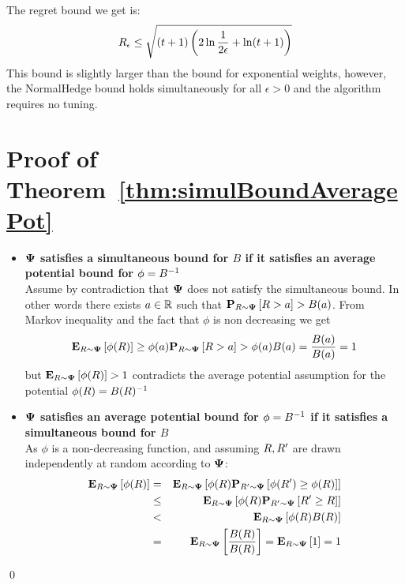 \documentclass{article}[12pt]
\begin{document}
The regret bound we get is:
\begin{equation}
  R_\epsilon \leq \sqrt{(t+1) \left(2 \ln \frac{1}{2\epsilon}+
      \ln (t+1)\right)}
\end{equation}
This bound is slightly larger than the bound for exponential weights,
however, the NormalHedge bound holds simultaneously for all
$\epsilon>0$ and the algorithm requires no tuning.




\appendix
\section{Proof of Theorem~\ref{thm:simulBoundAveragePot} \label{proof:simulBoundAveragePot}}
\proof
  \begin{itemize}
  \item
  {\bf ${\bf \Psi}$ satisfies a simultaneous bound for $B$ if it satisfies an
  average potential bound for $\phi = B^{-1}$}\\
Assume by contradiction that ${\bf \Psi}$ does not satisfy the simultaneous bound. In
other words there exists $a \in \mathbb{R}$ such that
${\bf P}_{R \sim {\bf \Psi}}\left[ R > a \right] > B(a)$. From Markov inequality and the fact
that $\phi$ is non decreasing we get
\[
  {\bf E}_{R \sim {\bf \Psi}}\left[ \phi(R) \right] \geq \phi(a) {\bf P}_{R \sim {\bf \Psi}}\left[ R > a \right] >
  \phi(a) B(a) = \frac{B(a)}{B(a)}=1
\]
but $ {\bf E}_{R \sim {\bf \Psi}}\left[ \phi(R) \right] >1$ contradicts the average potential
assumption for the potential $\phi(R) = B(R)^{-1}$
\item
{\bf ${\bf \Psi}$ satisfies an
  average potential bound for $\phi = B^{-1}$ if it satisfies a simultaneous bound for $B$}\\
As $\phi$ is a non-decreasing function, and assuming $R,R'$ are drawn
independently at random according to ${\bf \Psi}$:
\begin{eqnarray}
  {\bf E}_{R \sim {\bf \Psi}}\left[ \phi(R) \right] & = & {\bf E}_{R \sim {\bf \Psi}}\left[ \phi(R)
                                  {\bf P}_{R' \sim {\bf \Psi}}\left[ \phi(R') \geq \phi(R) \right] \right] \\
                            & \leq & {\bf E}_{R \sim {\bf \Psi}}\left[ \phi(R)
                                     {\bf P}_{R' \sim {\bf \Psi}}\left[ R' \geq R \right] \right] \\
                            & < & {\bf E}_{R \sim {\bf \Psi}}\left[ \phi(R) B(R) \right] \\
                            & = & {\bf E}_{R \sim {\bf \Psi}}\left[ \frac{B(R)}{B(R)} \right]
                                  = {\bf E}_{R \sim {\bf \Psi}}\left[ 1 \right] = 1
\end{eqnarray}
\end{itemize}
\qed
\end{document}
